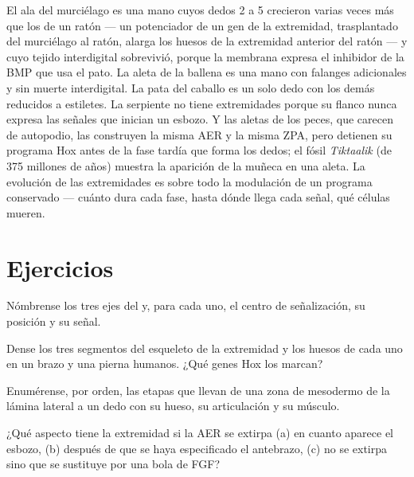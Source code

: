 \begin{example}\label{ex:b2:limb-organogenesis:evolution}
El ala del murciélago es una mano cuyos dedos 2 a 5 crecieron varias veces
más que los de un ratón --- un potenciador de un gen de la extremidad,
trasplantado del murciélago al ratón, alarga los huesos de la extremidad
anterior del ratón --- y cuyo tejido interdigital sobrevivió, porque la
membrana expresa el inhibidor de la BMP que usa el pato. La aleta de la
ballena es una mano con falanges adicionales y sin muerte interdigital.
La pata del caballo es un solo dedo con los demás reducidos a estiletes.
La serpiente no tiene extremidades porque su flanco nunca expresa las
señales que inician un esbozo. Y las aletas de los peces, que carecen de
autopodio, las construyen la misma AER y la misma ZPA, pero detienen su
programa Hox antes de la fase tardía que forma los dedos; el fósil
\emph{Tiktaalik} (de 375 millones de años) muestra la aparición de la
muñeca en una aleta. La evolución de las extremidades es sobre todo la
modulación de un programa conservado --- cuánto dura cada fase, hasta
dónde llega cada señal, qué células mueren.
\end{example}

\section{Ejercicios}

\begin{exercise}[$\star$]\label{exo:b2:limb-organogenesis:1}
Nómbrense los tres ejes del  y, para cada uno, el
centro de señalización, su posición y su señal.
\end{exercise}

\begin{exercise}[$\star$]\label{exo:b2:limb-organogenesis:2}
Dense los tres segmentos del esqueleto de la extremidad y los huesos de
cada uno en un brazo y una pierna humanos. ¿Qué genes Hox los marcan?
\end{exercise}

\begin{exercise}[$\star$]\label{exo:b2:limb-organogenesis:3}
Enumérense, por orden, las etapas que llevan de una zona de mesodermo de
la lámina lateral a un dedo con su hueso, su articulación y su músculo.
\end{exercise}

\begin{exercise}[$\star$]\label{exo:b2:limb-organogenesis:4}
¿Qué aspecto tiene la extremidad si la AER se extirpa (a) en cuanto
aparece el esbozo, (b) después de que se haya especificado el antebrazo,
(c) no se extirpa sino que se sustituye por una bola de FGF?
\end{exercise}


